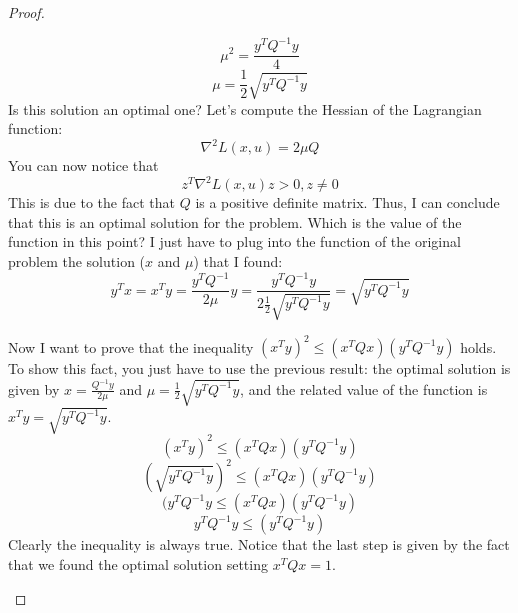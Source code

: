 \begin{proof}
\begin{enumerate}
        \[\mu^2=\frac{y^TQ^{-1}y}{4}\]
        \[\mu=\frac{1}{2}\sqrt{y^TQ^{-1}y}\]
        Is this solution an optimal one? Let's compute the Hessian of the Lagrangian function:
        \[\nabla^2L(x,u) = 2\mu Q\]
        You can now notice that
        \[z^T\nabla^2L(x,u)z > 0, z\neq 0\]
        This is due to the fact that \(Q\) is a positive definite matrix. Thus, I can conclude that this is an optimal solution for the problem. Which is the value of the function in this point? I just have to plug into the function of the original problem the solution (\(x\) and \(\mu\)) that I found:
        \[y^Tx = x^Ty = \frac{y^TQ^{-1}}{2\mu}y = \frac{y^TQ^{-1}y}{2\frac{1}{2}\sqrt{y^TQ^{-1}y}} = \sqrt{y^TQ^{-1}y}\]
        
        Now I want to prove that the inequality \((x^Ty)^2 \leq (x^TQx)(y^TQ^{-1}y)\) holds. To show this fact, you just have to use the previous result: the optimal solution is given by \(x = \frac{Q^{-1}y}{2\mu}\) and \(\mu=\frac{1}{2}\sqrt{y^TQ^{-1}y}\), and the related value of the function is \(x^Ty = \sqrt{y^TQ^{-1}y}\).
        \[(x^Ty)^2 \leq (x^TQx)(y^TQ^{-1}y)\]
        \[(\sqrt{y^TQ^{-1}y})^2 \leq (x^TQx)(y^TQ^{-1}y)\]
        \[(y^TQ^{-1}y \leq (x^TQx)(y^TQ^{-1}y)\]
        \[y^TQ^{-1}y \leq (y^TQ^{-1}y)\]
        Clearly the inequality is always true. Notice that the last step is given by the fact that we found the optimal solution setting \(x^TQx = 1\).
    \end{enumerate}
\end{proof}